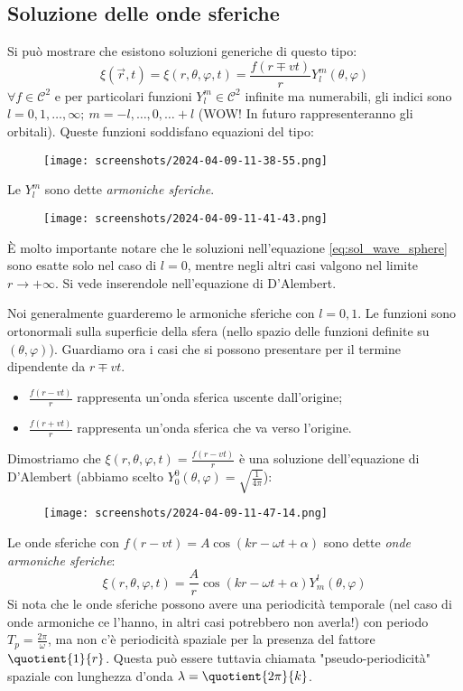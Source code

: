 \subsection{Soluzione delle onde sferiche}
Si può mostrare che esistono soluzioni generiche di questo tipo:
\begin{equation}\label{eq:sol_wave_sphere}
	\xi (\vec{r},t)=\xi (r,\theta ,\varphi ,t)=\frac{f(r\mp vt)}{r}Y^m_l(\theta ,\varphi )
\end{equation}
\(\forall f \in \mathcal{C} ^{2}\) e per particolari funzioni \(Y_l^m \in \mathcal{C} ^{2} \) infinite ma numerabili, gli indici sono \(l=0,1,\dots , \infty ;\ m =-l, \dots ,0,\dots +l\) (WOW! In futuro rappresenteranno gli orbitali). Queste funzioni soddisfano equazioni del tipo:
\begin{figure}[H]
	\centering
	\texttt{[image: screenshots/2024-04-09-11-38-55.png]}
\end{figure}
Le \(Y_l^m\) sono dette \emph{armoniche sferiche}.
\begin{figure}[H]
	\centering
	\texttt{[image: screenshots/2024-04-09-11-41-43.png]}
\end{figure}
\begin{note}
	È molto importante notare che le soluzioni nell'equazione \eqref{eq:sol_wave_sphere} sono esatte solo nel caso di \(l=0\), mentre negli altri casi valgono nel limite \(r \to +\infty \). Si vede inserendole nell'equazione di D'Alembert.
\end{note}
Noi generalmente guarderemo le armoniche sferiche con \(l=0,1\). Le funzioni sono ortonormali sulla superficie della sfera (nello spazio delle funzioni definite su \((\theta ,\varphi )\)).
Guardiamo ora i casi che si possono presentare per il termine dipendente da \(r\mp vt\).
\begin{itemize}
	\item \(\frac{f(r-vt)}{r}\) rappresenta un'onda sferica uscente dall'origine;
	\item \(\frac{f(r+vt)}{r}\) rappresenta un'onda sferica che va verso l'origine.
\end{itemize}
Dimostriamo che \(\xi (r,\theta ,\varphi ,t) = \frac{f(r-vt)}{r}\) è una soluzione dell'equazione di D'Alembert (abbiamo scelto \(Y_0^0(\theta ,\varphi )=\sqrt{\frac{1}{4\pi }} \)):
\begin{figure}[H]
	\centering
	\texttt{[image: screenshots/2024-04-09-11-47-14.png]}
\end{figure}
Le onde sferiche con \(f(r-vt)=A\cos (kr-\omega t +\alpha )\) sono dette \emph{onde armoniche sferiche}:
\begin{equation}
	\xi (r,\theta ,\varphi ,t)=\frac{A}{r}\cos (kr- \omega t+\alpha )Y_m^l(\theta ,\varphi )
\end{equation}
Si nota che le onde sferiche possono avere una periodicità temporale (nel caso di onde armoniche ce l'hanno, in altri casi potrebbero non averla!) con periodo \(T_p=\frac{2\pi }{\omega }\), ma non c'è periodicità spaziale per la presenza del fattore \(\quotient{1}{r}\). Questa può essere tuttavia chiamata "pseudo-periodicità" spaziale con lunghezza d'onda \(\lambda =\quotient{2\pi }{k} \).


